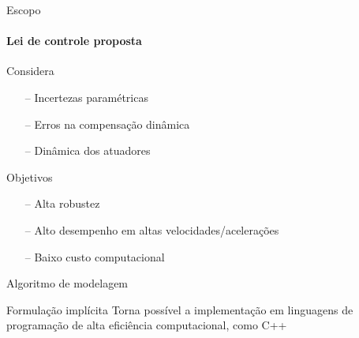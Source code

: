 \documentclass[25pt,landscape]{beamer}
\begin{document}
\begin{frame}{Escopo}
    \framesubtitle{Lei de controle proposta}
    \begin{block}{Considera}
    	\begin{itemize}
    		\item[--] Incertezas param\'etricas \\[8pt]
    		\item[--] Erros na compensa\c{c}\~ao din\^amica \\[8pt]
    		\item[--] Din\^amica dos atuadores \\[8pt]
    	\end{itemize}
    \end{block}
    \pause
    \begin{block}{Objetivos}
    	\begin{itemize}
    		\item[--] Alta robustez \\[8pt]
    		\item[--] Alto desempenho em altas velocidades/acelera\c{c}\~oes \\[8pt]
    		\item[--] Baixo custo computacional \\[8pt]
    	\end{itemize}
    \end{block}
\end{frame}

\begin{frame}{Algoritmo de modelagem}
    \pause
    \begin{block}{Formula\c{c}\~ao impl\'icita}
        Torna poss\'ivel a implementa\c{c}\~ao em linguagens de programa\c{c}\~ao de alta efici\^encia computacional, como C++
    \end{block}
\end{frame}
\end{document}
